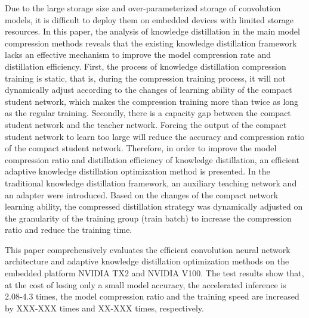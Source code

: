 \begin{abstract*}
Due to the large storage size and over-parameterized storage of convolution models, it is difficult to deploy them on embedded devices with limited storage resources. In this paper, the analysis of knowledge distillation in the main model compression methods reveals that the existing knowledge distillation framework lacks an effective mechanism to improve the model compression rate and distillation efficiency. First, the process of knowledge distillation compression training is static, that is, during the compression training process, it will not dynamically adjust according to the changes of learning ability of the compact student network, which makes the compression training more than twice as long as the regular training. Secondly, there is a capacity gap between the compact student network and the teacher network. Forcing the output of the compact student network to learn too large will reduce the accuracy and compression ratio of the compact student network. Therefore, in order to improve the model compression ratio and distillation efficiency of knowledge distillation, an efficient adaptive knowledge distillation optimization method is presented. In the traditional knowledge distillation framework, an auxiliary teaching network and an adapter were introduced. Based on the changes of the compact network learning ability, the compressed distillation strategy was dynamically adjusted on the granularity of the training group (train batch) to increase the compression ratio and reduce the training time.

This paper comprehensively evaluates the efficient convolution neural network architecture and adaptive knowledge distillation optimization methods on the embedded platform NVIDIA TX2 and NVIDIA V100. The test results show that, at the cost of losing only a small model accuracy, the accelerated inference is 2.08-4.3 times, the model compression ratio and the training speed are increased by XXX-XXX times and XX-XXX times, respectively.

\end{abstract*}
